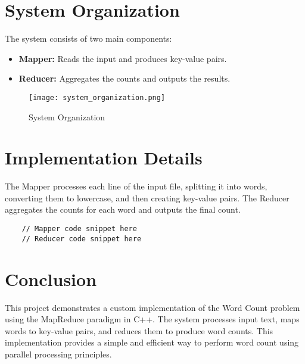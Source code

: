 \documentclass{article}
\begin{document}
\section{System Organization}
The system consists of two main components:
\begin{itemize}
    \item \textbf{Mapper:} Reads the input and produces key-value pairs.
    \item \textbf{Reducer:} Aggregates the counts and outputs the results.
\end{itemize}

\begin{figure}[h!]
\centering
\texttt{[image: system\_organization.png]}
\caption{System Organization}
\end{figure}

\section{Implementation Details}
The Mapper processes each line of the input file, splitting it into words, converting them to lowercase, and then creating key-value pairs. The Reducer aggregates the counts for each word and outputs the final count.

\begin{verbatim}
    // Mapper code snippet here
    // Reducer code snippet here
\end{verbatim}

\section{Conclusion}
This project demonstrates a custom implementation of the Word Count problem using the MapReduce paradigm in C++. The system processes input text, maps words to key-value pairs, and reduces them to produce word counts. This implementation provides a simple and efficient way to perform word count using parallel processing principles.
\end{document}
